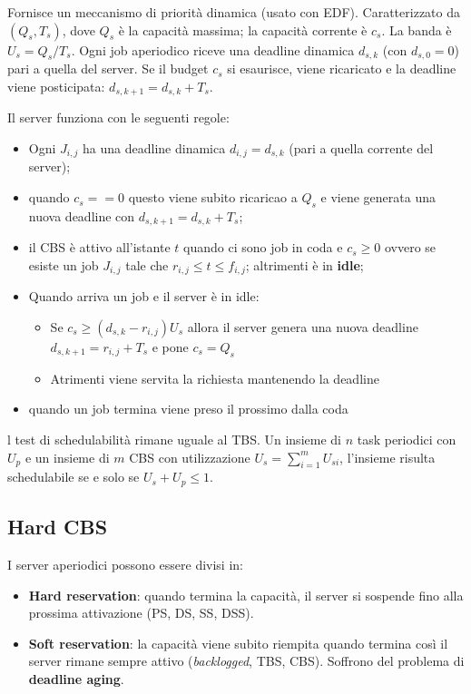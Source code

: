 \documentclass[11pt,a4paper]{report}
\begin{document}
Fornisce un meccanismo di priorità dinamica (usato con EDF). Caratterizzato da $(Q_s, T_s)$, dove $Q_s$ è la capacità massima; la capacità corrente è $c_s$. La banda è $U_s = Q_s / T_s$. Ogni job aperiodico riceve una deadline dinamica $d_{s,k}$ (con $d_{s,0} = 0$) pari a quella del server. Se il budget $c_s$ si esaurisce, viene ricaricato e la deadline viene posticipata: $d_{s,k+1} = d_{s,k} + T_s$.

Il server funziona con le seguenti regole:
\begin{itemize}
    \item Ogni $J_{i,j}$ ha una deadline dinamica $d_{i, j} = d_{s,k}$ (pari a quella corrente del server);
    \item quando $c_s = =0$ questo viene subito ricaricao a $Q_s$ e viene generata una nuova deadline con $d_{s, k + 1} = d_{s,k} + T_s$;
    \item il CBS è attivo all'istante $t$ quando ci sono job in coda e $c_s \ge 0$ ovvero se esiste un job $J_{i, j}$ tale che $r_{i, j} \leq t \leq f_{i, j}$; altrimenti è in \textbf{idle};
    \item Quando arriva un job e il server è in idle:
        \begin{itemize}
            \item Se $c_s \geq (d_{s,k} - r_{i, j})U_s$ allora il server genera una nuova deadline $d_{s,k+1} = r_{i, j} + T_s$ e pone $c_s = Q_s$
            \item Atrimenti viene servita la richiesta mantenendo la deadline
        \end{itemize}
    \item quando un job termina viene preso il prossimo dalla coda
\end{itemize}

l test di schedulabilità rimane uguale al TBS. Un insieme di $n$ task periodici con $U_p$ e un insieme di $m$ CBS con utilizzazione $U_s = \sum_{i = 1}^m U_{si}$, l'insieme risulta schedulabile se e solo se  $U_s + U_p \le 1$.


\subsection{Hard CBS}

I server aperiodici possono essere divisi in:
\begin{itemize}
    \item \textbf{Hard reservation}: quando termina la capacità, il server si sospende fino alla prossima attivazione (PS, DS, SS, DSS).
    \item \textbf{Soft reservation}: la capacità viene subito riempita quando termina così il server rimane sempre attivo (\textit{backlogged}, TBS, CBS). Soffrono del problema di \textbf{deadline aging}.
\end{itemize}
\end{document}
